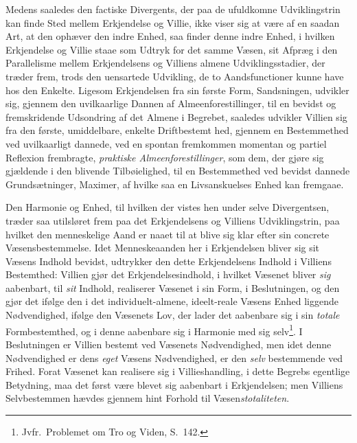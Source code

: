 Medens saaledes den factiske Divergents, der paa de ufuldkomne Udviklingstrin
kan finde Sted mellem Erkjendelse og Villie, ikke viser sig at være af en saadan
Art, at den ophæver den indre Enhed, saa finder denne indre Enhed, i hvilken
Erkjendelse og Villie staae som Udtryk for det samme Væsen, sit Afpræg i den
Parallelisme mellem Erkjendelsens og Villiens almene Udviklingsstadier, der
træder frem, trods den uensartede Udvikling, de to Aandsfunctioner kunne have
hos den Enkelte. Ligesom Erkjendelsen fra sin første Form, Sandsningen, udvikler
sig, gjennem den uvilkaarlige Dannen af Almeenforestillinger, til en bevidst og
fremskridende Udsondring af det Almene i Begrebet, saaledes udvikler Villien sig
fra den første, umiddelbare, enkelte Driftbestemt%
\setcounter{footnote}{0}%
hed, gjennem en Bestemmethed ved uvilkaarligt dannede, ved en spontan fremkommen
momentan og partiel Reflexion frembragte, \emph{praktiske Almeenforestillinger},
som dem, der gjøre sig gjældende i den blivende Tilbøielighed, til en
Bestemmethed ved bevidst dannede Grundsætninger, Maximer, af hvilke saa en
Livsanskuelses Enhed kan fremgaae.

Den Harmonie og Enhed, til hvilken der vistes hen under selve Divergentsen,
træder saa utilsløret frem paa det Erkjendelsens og Villiens Udviklingstrin, paa
hvilket den menneskelige Aand er naaet til at blive sig klar efter sin concrete
Væsensbestemmelse. Idet Menneskeaanden her i Erkjendelsen bliver sig sit Væsens
Indhold bevidst, udtrykker den dette Erkjendelsens Indhold i Villiens
Bestemthed: Villien gjør det Erkjendelsesindhold, i hvilket Væsenet bliver
\emph{sig} aabenbart, til \emph{sit} Indhold, realiserer Væsenet i sin Form, i
Beslutningen, og den gjør det ifølge den i det individuelt-almene, ideelt-reale
Væsens Enhed liggende Nødvendighed, ifølge den Væsenets Lov, der lader det
aabenbare sig i sin \emph{totale} Formbestemthed, og i denne aabenbare sig i
Harmonie med sig selv\footnote{Jvfr.\ Problemet om Tro og Viden, S.\ 142.}.
I Beslutningen er Villien bestemt ved Væsenets Nødvendighed, men idet denne
Nødvendighed er dens \emph{eget} Væsens Nødvendighed, er den \emph{selv}%
bestemmende ved Frihed.
Forat Væsenet kan realisere sig i Villieshandling, i dette Begrebs egentlige
Betydning, maa det først være blevet sig aabenbart i Erkjendelsen; men Villiens
Selvbestemmen hævdes gjennem hint Forhold til Væsen\emph{stotaliteten}.

